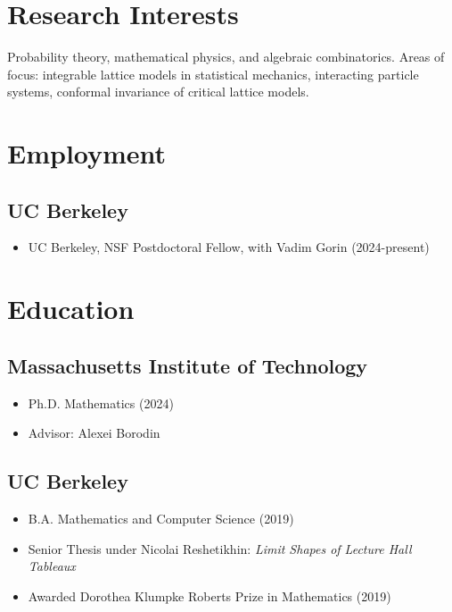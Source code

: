 \documentclass{cv_style}
\begin{document}

    \begin{center}  

    
	\end{center}
	
	\section{Research Interests}
	Probability theory, mathematical physics, and algebraic combinatorics. Areas of focus: integrable lattice models in statistical mechanics, interacting particle systems, conformal invariance of critical lattice models.
	
	\section{Employment}
		\subsection{UC Berkeley}
				\begin{itemize}
					\item  UC Berkeley, NSF Postdoctoral Fellow, with Vadim Gorin (2024-present)
				\end{itemize}
				
		

	\section{Education}
		\subsection{Massachusetts Institute of Technology}
				\begin{itemize}
					\item Ph.D. Mathematics (2024)
					\vspace{-2mm}
					\item Advisor: Alexei Borodin
				\end{itemize}
				
		\subsection{UC Berkeley}
				\begin{itemize}
					\item B.A. Mathematics and Computer Science (2019)
					\vspace{-2mm}
					\item Senior Thesis under Nicolai Reshetikhin: {\em Limit Shapes of Lecture Hall Tableaux}
					\vspace{-2mm}
					\item Awarded Dorothea Klumpke Roberts Prize in Mathematics (2019)
				\end{itemize}
		
\end{document}

